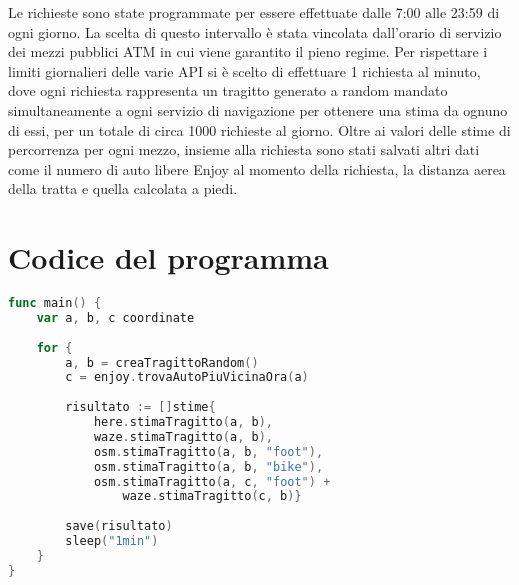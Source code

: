 Le richieste sono state programmate per essere effettuate dalle 7:00 alle 23:59 di ogni giorno. La scelta di questo intervallo è stata vincolata dall'orario di servizio dei mezzi pubblici ATM in cui viene garantito il pieno regime. Per rispettare i limiti giornalieri delle varie API si è scelto di effettuare 1 richiesta al minuto, dove ogni richiesta rappresenta un tragitto generato a random mandato simultaneamente a ogni servizio di navigazione per ottenere una stima da ognuno di essi, per un totale di circa 1000 richieste al giorno. Oltre ai valori delle stime di percorrenza per ogni mezzo, insieme alla richiesta sono stati salvati altri dati come il numero di auto libere Enjoy al momento della richiesta, la distanza aerea della tratta e quella calcolata a piedi. 

\section{Codice del programma}

\begin{lstlisting}[language=Go]
func main() {
	var a, b, c coordinate
	
	for {
		a, b = creaTragittoRandom()
		c = enjoy.trovaAutoPiuVicinaOra(a)
		
		risultato := []stime{
			here.stimaTragitto(a, b),
			waze.stimaTragitto(a, b),
			osm.stimaTragitto(a, b, "foot"),
			osm.stimaTragitto(a, b, "bike"),
			osm.stimaTragitto(a, c, "foot") +
				waze.stimaTragitto(c, b)}
		
		save(risultato)
		sleep("1min")
	}
}
\end{lstlisting}